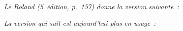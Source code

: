
\emph{\footnotesize Le Roland (5\ieme\ édition, p. 157) donne la version suivante :}


\emph{\footnotesize La version qui suit est aujourd'hui plus en usage :}

